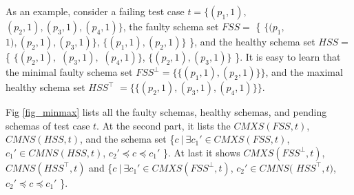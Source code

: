{%
%

As an example, consider a failing test case $t = \{(p_{1}, 1),$ $ (p_{2}, 1), (p_{3}, 1), (p_{4}, 1)\}$, the faulty schema set $FSS =$ \{ $\{(p_{1}, $ $1), (p_{2}, 1), (p_{3}, 1)\}$, $\{(p_{1}, 1), (p_{2}, 1)\}$ \}, and the healthy schema set $HSS =$  \{ $\{(p_{2}, 1),$ $(p_{3}, 1),$ $(p_{4}, 1)\}$, $\{(p_{2}, 1), (p_{3}, 1)\}$ \}. It is easy to learn that the minimal faulty schema set $FSS^{\bot} = \{\{(p_{1}, 1), (p_{2}, 1)\}\}$, and the maximal healthy schema set $HSS^{\top}$ $= \{\{ (p_{2}, 1), (p_{3}, 1), (p_{4}, 1) \}\}$.

Fig \ref{fig_minmax} lists all the faulty schemas, healthy schemas, and pending schemas of test case $t$. At the second part, it lists the $CMXS(FSS, t)$, $CMNS(HSS, t)$, and the schema set \{$ c\ |\ \exists c_{1}' \in CMXS(FSS, t)$, $c_{1}' \in CMNS(HSS, t)$, $c_{2}' \preceq c \preceq c_{1}'$ \}. At last it shows $CMXS(FSS^{\bot}, t)$, $CMNS(HSS^{\top}, t)$ and  \{$ c\ |\ \exists c_{1}' \in CMXS(FSS^{\bot}, t)$, $ c_{2}' \in CMNS($ $HSS^{\top}, t)$, $c_{2}' \preceq c \preceq c_{1}'$ \}.


}
